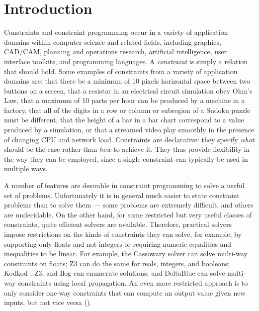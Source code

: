 \section{Introduction}
\label{sec:introduction}
Constraints and constraint programming occur in a variety of
application domains within computer science and related fields,
including graphics, CAD/CAM, planning and operations research,
artificial intelligence, user interface toolkits, and programming
languages. A \emph{constraint} is simply a relation that
should hold.  Some examples of constraints from a variety of
application domains are: that there be a minimum of 10 pixels
horizontal space between two buttons on a screen, that a resistor in
an electrical circuit simulation obey Ohm's Law, that a maximum of 10
parts per hour can be produced by a machine in a factory, that all of
the digits in a row or column or subregion of a Sudoku puzzle must be
different, that the height of a bar in a bar chart correspond to a
value produced by a simulation,
or that a streamed video play smoothly in the presence of
changing CPU and network load.  Constraints are declarative: they
specify \emph{what} should be the case rather than \emph{how} to
achieve it.  They thus provide flexibility in the way they can be
employed, since a single constraint can typically be used in multiple
ways.

A number of features are desirable in constraint programming to solve
a useful set of problems.  Unfortunately it is in general much easier
to state constraint problems than to solve them --- some problems are
extremely difficult, and others are undecidable. On the other hand,
for some restricted but very useful classes of constraints, quite
efficient solvers are available.  Therefore, practical solvers impose
restrictions on the kinds of constraints they can solve, for example,
by supporting only floats and not integers or requiring numeric
equalities and inequalities to be linear.  For example, the Cassowary
solver \cite{badros-tochi-2001} can solve multi-way constraints on
floats; Z3 \cite{de2008z3} can do the same for reals, integers, and
booleans; Kodkod \cite{torlak2007kodkod}, Z3, and Ilog
\DIFdelbegin {}\DIFdelend \DIFaddbegin {}\DIFaddend can enumerate solutions; and DeltaBlue
\cite{freeman-benson-phoenix-1989} can solve multi-way constraints
using local propagation.  An even more restricted approach is to only
consider one-way constraints that can compute an output value given
new inputs, but not vice versa
(\eg \cite{hudson-uist-1996,myers-ieee-computer-1990}).


